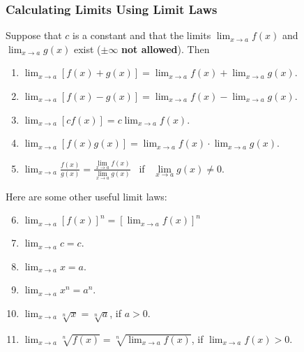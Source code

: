 \begin{frame}
\frametitle{Calculating Limits Using Limit Laws}
\begin{theorem}
Suppose that $c$ is a constant and that the limits %
$\displaystyle \lim_{x\rightarrow a} f(x)$ and $\displaystyle \lim_{x\rightarrow a}g(x)$ %
exist ($\pm\infty$ \textbf{not allowed}).  Then
\begin{enumerate}
\item<1-| alert@2>  $\displaystyle \lim_{x\rightarrow a}[f(x) + g(x)] = \lim_{x\rightarrow a} f(x) + \lim_{x\rightarrow a} g(x)$.
\item<1-| alert@3>  $\displaystyle \lim_{x\rightarrow a}[f(x) - g(x)] = \lim_{x\rightarrow a} f(x) - \lim_{x\rightarrow a} g(x)$.
\item<1-| alert@4>  $\displaystyle \lim_{x\rightarrow a}[cf(x)] = c\lim_{x\rightarrow a} f(x)$. 
\item<1-| alert@5>  $\displaystyle \lim_{x\rightarrow a}[f(x)g(x)] = \lim_{x\rightarrow a} f(x) \cdot \lim_{x\rightarrow a} g(x)$.
\item<1-| alert@6>  $\displaystyle \lim_{x\rightarrow a}\frac{f(x)}{g(x)} = \frac{\lim\limits_{x\rightarrow a} f(x)}{\lim\limits_{x\rightarrow a} g(x)}$ \ if \ $\displaystyle \lim\limits_{x\rightarrow a}g(x) \neq 0$.
\end{enumerate}
\end{theorem}
\alert<2->{
}
\end{frame}


\begin{frame}
Here are some other useful limit laws:

\begin{enumerate}
\setcounter{enumi}{5}
\item<1-| alert@2> $\displaystyle \lim_{x\rightarrow a} [f(x)]^n = [\lim_{x\rightarrow a} f(x)]^n$
\item<1-| alert@4> $\displaystyle \lim_{x\rightarrow a} c = c$.
\item<1-| alert@4> $\displaystyle \lim_{x\rightarrow a} x = a$.
\item<1-| alert@4> $\displaystyle \lim_{x\rightarrow a} x^n = a^n$.
\item<1-| alert@4> $\displaystyle \lim_{x\rightarrow a} \sqrt[n]{x} = \sqrt[n]{a}$, if $a>0$.
\item<1-| alert@3> $\displaystyle \lim_{x\rightarrow a} \sqrt[n]{f(x)} = \sqrt[n]{\lim_{x\rightarrow a}f(x)}$, if $\lim_{x\rightarrow a} f(x)>0 $.  
\end{enumerate}
\alert{
}
\end{frame}
